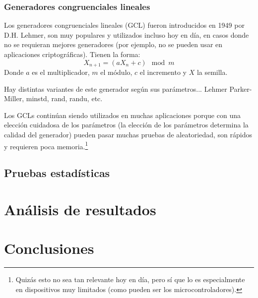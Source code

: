 \subsubsection{Generadores congruenciales lineales}
Los generadores congruenciales lineales (GCL) fueron introducidos en 1949 por D.H. Lehmer, son muy populares y utilizados incluso hoy en día, en casos donde no se requieran mejores generadores (por ejemplo, no se pueden usar en aplicaciones criptográficas). Tienen la forma:
\begin{equation}
    \label{eq:formula-gcl}
    X_{n+1} = (aX_{n}+c)\mod m
\end{equation}
Donde $a$ es el multiplicador, $m$ el módulo, $c$ el incremento y $X$ la semilla.

Hay distintas variantes de este generador según sus parámetros... Lehmer Parker-Miller, minstd, rand, randu, etc.

Los GCLs continúan siendo utilizados en muchas aplicaciones porque con una elección cuidadosa de los parámetros (la elección de los parámetros determina la calidad del generador) pueden pasar muchas pruebas de aleatoriedad, son rápidos y requieren poca memoria.\footnote{Quizás esto no sea tan relevante hoy en día, pero sí que lo es especialmente en dispositivos muy limitados (como pueden ser los microcontroladores).}

\subsection{Pruebas estadísticas}





\section{Análisis de resultados}


\section{Conclusiones}
